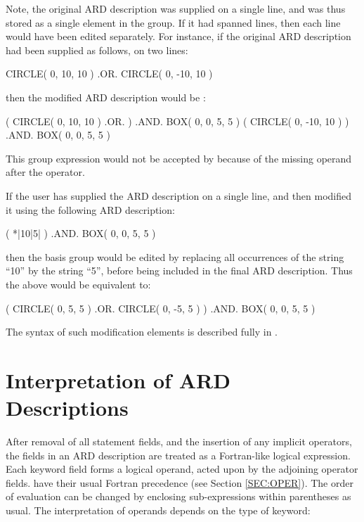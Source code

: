 \documentclass[11pt,nolof]{starlink}
\begin{document}
Note, the original ARD description was supplied on a single line, and was
thus stored as a single element in the group. If it had spanned lines,
then each line would have been edited separately. For instance, if the
original ARD description had been supplied as follows, on two lines:

\small
\begin{terminalv}
      CIRCLE( 0, 10, 10 ) .OR.
      CIRCLE( 0, -10, 10 )
\end{terminalv}
\normalsize

then the modified ARD description would be :

\small
\begin{terminalv}
      ( CIRCLE( 0, 10, 10 ) .OR. ) .AND. BOX( 0, 0, 5, 5 )
      ( CIRCLE( 0, -10, 10 ) ) .AND. BOX( 0, 0, 5, 5 )
\end{terminalv}
\normalsize

This group expression would not be accepted by 
because of the missing operand after the  operator.

If the user has supplied the ARD description on a single line, and then
modified it using the following ARD description:

\small
\begin{terminalv}
      ( *|10|5| ) .AND. BOX( 0, 0, 5, 5 )
\end{terminalv}
\normalsize

then the basis group would be edited by replacing all occurrences of the
string ``10'' by the string ``5'', before being included in the final ARD
description. Thus the above would be equivalent to:

\small
\begin{terminalv}
      ( CIRCLE( 0, 5, 5 ) .OR. CIRCLE( 0, -5, 5 ) ) .AND. BOX( 0, 0, 5, 5 )
\end{terminalv}
\normalsize

The syntax of such modification elements is described fully in .

\section{Interpretation of ARD Descriptions}
After removal of all statement fields, and the insertion of any implicit 
operators, the fields in an ARD description are treated as a Fortran-like
logical expression. Each keyword field forms a logical operand, acted upon by
the adjoining operator fields.  have their usual Fortran precedence
(see Section \ref{SEC:OPER}). The order of evaluation can be changed by
enclosing sub-expressions within parentheses as usual. The interpretation of
operands depends on the type of keyword:
\end{document}
